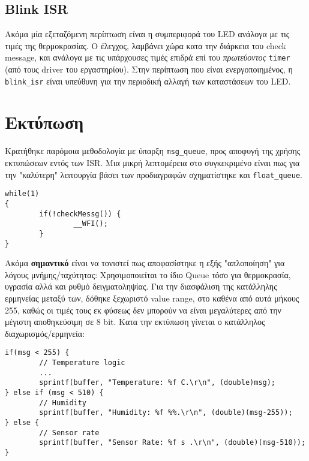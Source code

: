 \documentclass[11pt]{article}
\begin{document}
\subsection{Blink ISR}
\label{sec:org5a6ee31}
Ακόμα μία εξεταζόμενη περίπτωση είναι η συμπεριφορά του LED ανάλογα με
τις τιμές της θερμοκρασίας. Ο έλεγχος, λαμβάνει χώρα κατα την διάρκεια
του check message, και ανάλογα με τις υπάρχουσες τιμές επιδρά επί του
\emph{πρωτεύοντος} \texttt{timer} (από τους driver του εργαστηρίου). Στην περίπτωση
που είναι ενεργοποιημένος, η \texttt{blink\_isr} είναι υπεύθυνη για την
περιοδική αλλαγή των καταστάσεων του LED.
\section{Εκτύπωση}
\label{sec:org4c111d3}
Κρατήθηκε παρόμοια μεθοδολογία με ύπαρξη \texttt{msg\_queue}, προς αποφυγή της
χρήσης εκτυπώσεων εντός των ISR. Μια μικρή λεπτομέρεια στο
συγκεκριμένο είναι πως για την "καλύτερη" λειτουργία βάσει των
προδιαγραφών σχηματίστηκε και \texttt{float\_queue}.
\begin{verbatim}
while(1)
{
        if(!checkMessg()) {
                __WFI();
        }	
}
\end{verbatim}

Ακόμα \textbf{σημαντικό} είναι να τονιστεί πως αποφασίστηκε η εξής "απλοποίηση"
για λόγους μνήμης/ταχύτητας: Χρησιμοποιείται το ίδιο Queue τόσο για
θερμοκρασία, υγρασία αλλά και ρυθμό δειγματοληψίας. Για την διασφάλιση
της κατάλληλης ερμηνείας μεταξύ των, δόθηκε ξεχωριστό value range, στο
καθένα από αυτά μήκους 255, καθώς οι τιμές τους εκ φύσεως δεν μπορούν
να είναι μεγαλύτερες από την μέγιστη αποθηκεύσιμη σε 8 bit. Κατα την
εκτύπωση γίνεται ο κατάλληλος διαχωρισμός/ερμηνεία:

\begin{verbatim}
if(msg < 255) {
        // Temperature logic
        ...
        sprintf(buffer, "Temperature: %f C.\r\n", (double)msg);
} else if (msg < 510) {
        // Humidity
        sprintf(buffer, "Humidity: %f %%.\r\n", (double)(msg-255));
} else {
        // Sensor rate
        sprintf(buffer, "Sensor Rate: %f s .\r\n", (double)(msg-510));
}
\end{verbatim}
\end{document}
